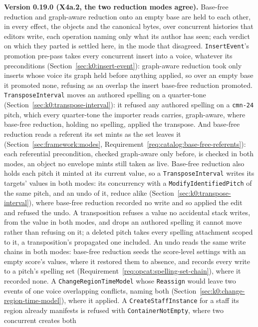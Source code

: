 \documentclass[11pt,letterpaper]{report}
\begin{document}
\noindent\textbf{Version 0.19.0 (X4a.2, the two reduction modes agree).}
Base-free reduction and graph-aware reduction onto an empty base are held to
each other, in every effect, the objects and the canonical bytes, over
concurrent histories that editors write, each operation naming only what its
author has seen; each verdict on which they parted is settled here, in the
mode that disagreed. \texttt{InsertEvent}'s promotion pre-pass takes every
concurrent insert into a voice, whatever its preconditions
(Section~\ref{sec:k0:insert-event}): graph-aware reduction took only inserts
whose voice its graph held before anything applied, so over an empty base it
promoted none, refusing as an overlap the insert base-free reduction promoted.
\texttt{TransposeInterval} moves an authored spelling on a quarter-tone
(Section~\ref{sec:k0:transpose-interval}): it refused any authored spelling
on a \texttt{cmn-24} pitch, which every quarter-tone the importer reads
carries, graph-aware, where base-free reduction, holding no spelling, applied
the transpose. And base-free reduction reads a referent its set mints as the
set leaves it (Section~\ref{sec:framework:modes},
Requirement~\ref{req:catalog:base-free-referents}): each referential
precondition, checked graph-aware only before, is checked in both modes, an
object no envelope mints still taken as live. Base-free reduction also holds
each pitch it minted at its current value, so a \texttt{TransposeInterval}
writes its targets' values in both modes: its concurrency with a
\texttt{ModifyIdentifiedPitch} of the same pitch, and an undo of it, reduce
alike (Section~\ref{sec:k0:transpose-interval}), where base-free reduction
recorded no write and so applied the edit and refused the undo. A
transposition refuses a value no accidental stack writes, from the value in
both modes, and drops an authored spelling it cannot move rather than refusing
on it; a deleted pitch takes every spelling attachment scoped to it, a
transposition's propagated one included. An undo reads the same write
chains in both modes: base-free reduction seeds the score-level settings
with an empty score's values, where it restored them to absence, and records
every write to a pitch's spelling set
(Requirement~\ref{req:opcat:spelling-set-chain}), where it recorded none. A
\texttt{ChangeRegionTimeModel} whose \texttt{Reassign} would leave two events
of one voice overlapping conflicts, naming both
(Section~\ref{sec:k0:change-region-time-model}), where it applied. A
\texttt{CreateStaffInstance} for a staff its region already manifests is
refused with \texttt{ContainerNotEmpty}, where two concurrent creates both
\end{document}
